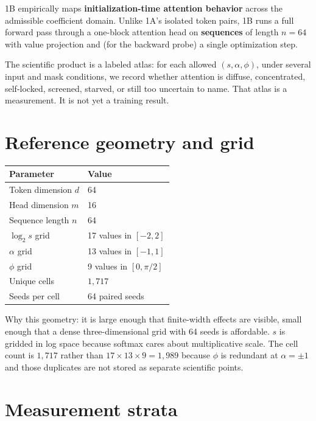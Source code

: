 \documentclass[11pt,a4paper]{report}
\begin{document}
1B empirically maps \textbf{initialization-time attention behavior} across the admissible coefficient domain. Unlike 1A's isolated token pairs, 1B runs a full forward pass through a one-block attention head on \textbf{sequences} of length $n=64$ with value projection and (for the backward probe) a single optimization step.

The scientific product is a labeled atlas: for each allowed $(s,\alpha,\phi)$, under several input and mask conditions, we record whether attention is diffuse, concentrated, self-locked, screened, starved, or still too uncertain to name. That atlas is a measurement. It is not yet a training result.

\section{Reference geometry and grid}

\begin{center}
\begin{tabular}{ll}
\toprule
Parameter & Value \\
\midrule
Token dimension $d$ & 64 \\
Head dimension $m$ & 16 \\
Sequence length $n$ & 64 \\
$\log_2 s$ grid & 17 values in $[-2,2]$ \\
$\alpha$ grid & 13 values in $[-1,1]$ \\
$\phi$ grid & 9 values in $[0,\pi/2]$ \\
Unique cells & $1{,}717$ \\
Seeds per cell & 64 paired seeds \\
\bottomrule
\end{tabular}
\end{center}

Why this geometry: it is large enough that finite-width effects are visible, small enough that a dense three-dimensional grid with 64 seeds is affordable. $s$ is gridded in log space because softmax cares about multiplicative scale. The cell count is $1{,}717$ rather than $17\times 13\times 9=1{,}989$ because $\phi$ is redundant at $\alpha=\pm 1$ and those duplicates are not stored as separate scientific points.

\section{Measurement strata}
\end{document}
